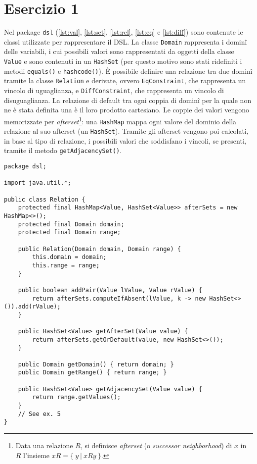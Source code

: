 \section*{Esercizio 1}

Nel package {\tt dsl} (\autoref{lst:val}, \ref{lst:set}, \ref{lst:rel},
\ref{lst:eq} e \ref{lst:diff}) sono contenute le classi utilizzate per
rappresentare il DSL. La classe \texttt{Domain} rappresenta i dominî delle
variabili, i cui possibili valori sono rappresentati da oggetti della classe
\texttt{Value} e sono contenuti in un {\tt HashSet} (per questo motivo sono
stati ridefiniti i metodi {\tt equals()} e {\tt hashcode()}). È possibile
definire una relazione tra due dominî tramite la classe {\tt Relation} e
derivate, ovvero {\tt EqConstraint}, che rappresenta un vincolo di uguaglianza,
e {\tt DiffConstraint}, che rappresenta un vincolo di disuguaglianza. La
relazione di default tra ogni coppia di dominî per la quale non ne è stata
definita una è il loro prodotto cartesiano. Le coppie dei valori vengono
memorizzate per \emph{afterset}\footnote{Data una relazione $R$, si definisce
\emph{afterset} (o \emph{successor neighborhood}) di $x$ in $R$ l'insieme $xR = \{\
y\ |\ xRy\ \}$.}: una {\tt HashMap} mappa ogni valore del dominio della
relazione al suo afterset (un {\tt HashSet}). Tramite gli afterset vengono poi
calcolati, in base al tipo di relazione, i possibili valori che soddisfano i
vincoli, se presenti, tramite il metodo  {\tt getAdjacencySet()}.




\bgroup
{}
\begin{lstlisting}[caption=Relation.java, label=lst:rel]
package dsl;

import java.util.*;

public class Relation {
    protected final HashMap<Value, HashSet<Value>> afterSets = new HashMap<>();
    protected final Domain domain;
    protected final Domain range;

    public Relation(Domain domain, Domain range) {
        this.domain = domain;
        this.range = range;
    }

    public boolean addPair(Value lValue, Value rValue) {
        return afterSets.computeIfAbsent(lValue, k -> new HashSet<>()).add(rValue);
    }

    public HashSet<Value> getAfterSet(Value value) {
        return afterSets.getOrDefault(value, new HashSet<>());
    }

    public Domain getDomain() { return domain; }
    public Domain getRange() { return range; }

    public HashSet<Value> getAdjacencySet(Value value) {
        return range.getValues();
    }
    // See ex. 5
}
\end{lstlisting}
\egroup

